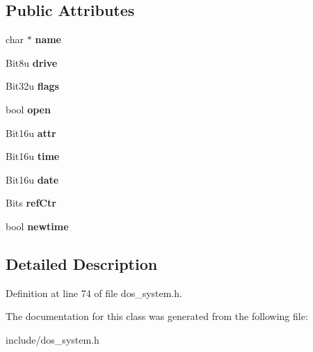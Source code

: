 \subsection*{Public Attributes}
\begin{DoxyCompactItemize}
\item 
\hypertarget{classDOS__File_a3e326c162b838b065ee83c27a112be65}{char $\ast$ {\bfseries name}}\label{classDOS__File_a3e326c162b838b065ee83c27a112be65}

\item 
\hypertarget{classDOS__File_a253253ed788a32410df6b9ecc638366f}{Bit8u {\bfseries drive}}\label{classDOS__File_a253253ed788a32410df6b9ecc638366f}

\item 
\hypertarget{classDOS__File_a2b1d061b180a8953a2e8a8ebc4021965}{Bit32u {\bfseries flags}}\label{classDOS__File_a2b1d061b180a8953a2e8a8ebc4021965}

\item 
\hypertarget{classDOS__File_a242898b780b6ca73db43631d1976caa6}{bool {\bfseries open}}\label{classDOS__File_a242898b780b6ca73db43631d1976caa6}

\item 
\hypertarget{classDOS__File_a8887614fa27d3180810eafb8c71f28fc}{Bit16u {\bfseries attr}}\label{classDOS__File_a8887614fa27d3180810eafb8c71f28fc}

\item 
\hypertarget{classDOS__File_aa15d5348eadb19dff76ce4b018504190}{Bit16u {\bfseries time}}\label{classDOS__File_aa15d5348eadb19dff76ce4b018504190}

\item 
\hypertarget{classDOS__File_aa1425a8936805dd77cfe74b353d39049}{Bit16u {\bfseries date}}\label{classDOS__File_aa1425a8936805dd77cfe74b353d39049}

\item 
\hypertarget{classDOS__File_ab3d966fce7a4b7f3b5c691a6d8a3249b}{Bits {\bfseries ref\-Ctr}}\label{classDOS__File_ab3d966fce7a4b7f3b5c691a6d8a3249b}

\item 
\hypertarget{classDOS__File_a9a1cf63a07117706b255cc89a1183d23}{bool {\bfseries newtime}}\label{classDOS__File_a9a1cf63a07117706b255cc89a1183d23}

\end{DoxyCompactItemize}


\subsection{Detailed Description}


Definition at line 74 of file dos\-\_\-system.\-h.



The documentation for this class was generated from the following file\-:\begin{DoxyCompactItemize}
\item 
include/dos\-\_\-system.\-h\end{DoxyCompactItemize}
